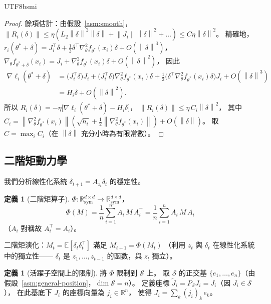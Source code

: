 \documentclass[11pt,a4paper]{article}
\theoremstyle{definition}
\newtheorem{definition}[theorem]{定義}
\newcommand{\R}{\mathbb{R}}
\newcommand{\E}{\mathbb{E}}
\newcommand{\cS}{\mathcal{S}}
\newcommand{\norm}[1]{\left\|#1\right\|}
\begin{document}
\begin{CJK}{UTF8}{bsmi}
\begin{proof}
  餘項估計：由假設~\ref{asm:smooth}，
  $\norm{R_i(\delta)} \leq \eta(L_2\norm{\delta}^2\norm{\delta} + \norm{J_i}\norm{\delta}^2 + \ldots)
  \leq C\eta\norm{\delta}^2$。
  精確地，
  $r_i(\theta^*+\delta) = J_i^\top\delta + \frac{1}{2}\delta^\top\nabla^2_\theta f_{\theta^*}(x_i)\delta + O(\norm{\delta}^3)$，
  $\nabla_\theta f_{\theta^*+\delta}(x_i) = J_i + \nabla^2_\theta f_{\theta^*}(x_i)\delta + O(\norm{\delta}^2)$，
  因此
  \begin{align*}
    \nabla\ell_i(\theta^*+\delta)
    &= \bigl(J_i^\top\delta\bigr)J_i
      + \bigl(J_i^\top\delta\bigr)\nabla^2_\theta f_{\theta^*}(x_i)\delta
      + \tfrac{1}{2}\bigl(\delta^\top\nabla^2_\theta f_{\theta^*}(x_i)\delta\bigr)J_i
      + O(\norm{\delta}^3)\\
    &= H_i\delta + O(\norm{\delta}^2).
  \end{align*}
  所以 $R_i(\delta) = -\eta\bigl[\nabla\ell_i(\theta^*+\delta) - H_i\delta\bigr]$，
  $\norm{R_i(\delta)} \leq \eta\,C_i\norm{\delta}^2$，
  其中 $C_i = \norm{\nabla^2_\theta f_{\theta^*}(x_i)}(\sqrt{h_i} + \frac{1}{2}\norm{\nabla^2_\theta f_{\theta^*}(x_i)}) + O(\norm{\delta})$。
  取 $C = \max_i C_i$（在 $\norm{\delta}$ 充分小時為有限常數）。
\end{proof}


\subsection{二階矩動力學}

我們分析線性化系統 $\delta_{t+1} = A_{z_t}\delta_t$ 的穩定性。

\begin{definition}[二階矩算子]
  $\Phi : \R^{d \times d}_{\text{sym}} \to \R^{d \times d}_{\text{sym}}$，
  \[
    \Phi(M) = \frac{1}{n}\sum_{i=1}^n A_i\,M\,A_i^\top = \frac{1}{n}\sum_{i=1}^n A_i\,M\,A_i
  \]
  （$A_i$ 對稱故 $A_i^\top = A_i$）。
\end{definition}

二階矩演化：$M_t = \E[\delta_t\delta_t^\top]$ 滿足 $M_{t+1} = \Phi(M_t)$
（利用 $z_t$ 與 $\delta_t$ 在線性化系統中的獨立性——
$\delta_t$ 是 $z_1,\ldots,z_{t-1}$ 的函數，與 $z_t$ 獨立）。

\begin{definition}[活躍子空間上的限制]
  將 $\Phi$ 限制到 $\cS$ 上。
  取 $\cS$ 的正交基 $\{e_1,\ldots,e_n\}$（由假設~\ref{asm:general-position}，$\dim\cS = n$）。
  定義座標 $\tilde{J}_i = P_\cS J_i = J_i$（因 $J_i \in \cS$），
  在此基底下 $J_i$ 的座標向量為 $j_i \in \R^n$，
  使得 $J_i = \sum_k (j_i)_k\,e_k$。


\end{definition}
\end{CJK}
\end{document}
